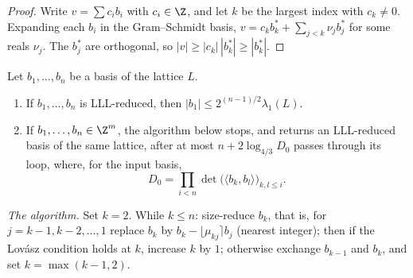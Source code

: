 \begin{proof}
Write $v=\sum c_ib_i$ with $c_i\in\Z$, and let $k$ be the largest index with $c_k\ne0$. Expanding each $b_i$ in the Gram--Schmidt basis, $v=c_kb_k^*+\sum_{j<k}\nu_jb_j^*$ for some reals $\nu_j$. The $b_j^*$ are orthogonal, so
$|v|\ge|c_k|\,|b_k^*|\ge|b_k^*|$.
\end{proof}

\begin{theorem}\label{thm:lll}
Let $b_1,\dots,b_n$ be a basis of the lattice $L$.
\begin{enumerate}[label=(\alph*)]
\item If $b_1,\dots,b_n$ is LLL-reduced, then $|b_1|\le2^{(n-1)/2}\lambda_1(L)$.
\item If $b_1,\dots,b_n\in\Z^m$, the algorithm below stops, and returns an LLL-reduced basis of the same lattice, after at most $n+2\log_{4/3}D_0$ passes through its loop, where, for the input basis,
\[
D_0=\prod_{i<n}\det\bigl(\langle b_k,b_l\rangle\bigr)_{k,l\le i}.
\]
\end{enumerate}
\end{theorem}

\emph{The algorithm.} Set $k=2$. While $k\le n$: size-reduce $b_k$, that is, for $j=k-1,k-2,\dots,1$ replace $b_k$ by $b_k-\lfloor\mu_{kj}\rceil b_j$ (nearest integer); then if the Lov\'asz condition
holds at $k$, increase $k$ by $1$; otherwise exchange $b_{k-1}$ and $b_k$, and set $k=\max(k-1,2)$.

